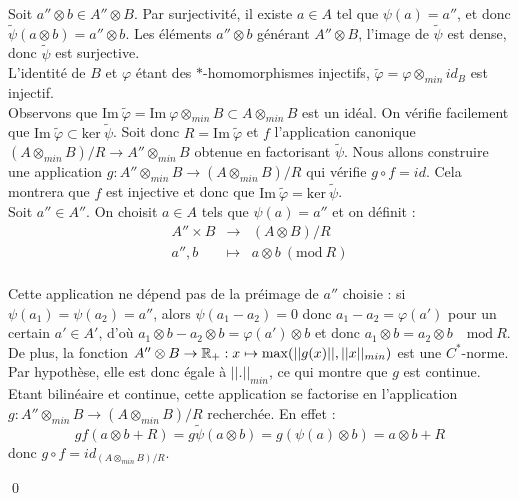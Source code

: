 \begin{dem}
Soit $a''\otimes b \in A''\otimes B$. Par surjectivité, il existe $a\in A$ tel que $\psi(a)=a''$, et donc $\tilde\psi(a\otimes b ) = a''\otimes b$. Les éléments $a''\otimes b$ générant $A''\otimes B$, l'image de $\tilde \psi$ est dense, donc $\tilde \psi$ est surjective.\\

L'identité de $B$ et $\varphi$ étant des $*$-homomorphismes injectifs, $\tilde\varphi = \varphi \otimes_{min}id_B$ est injectif.\\

Observons que $\text{Im} \ \tilde\varphi =\text{Im}\ \varphi \otimes_{min} B\subset A\otimes_{min} B$ est un idéal.  On vérifie facilement que $\text{Im} \ \tilde\varphi \subset \text{ker}\ \tilde \psi $. Soit donc $R=\text{Im} \ \tilde\varphi$ et $f$ l'application canonique $(A\otimes_{min} B)/ R \rightarrow A''\otimes_{min} B$ obtenue en factorisant $\tilde \psi$. Nous allons construire une application $g : A''\otimes_{min} B \rightarrow (A\otimes_{min} B)/ R $ qui vérifie $g\circ f = id $. Cela montrera que $f$ est injective et donc que $\text{Im} \ \tilde\varphi = \text{ker}\ \tilde \psi $.\\

Soit $a''\in A''$. On choisit $a\in A$ tels que $\psi(a)=a''$ et on définit : 
\[\begin{array}{rcl}
A''\times B & \rightarrow & (A\otimes B) /R \\
a'', b          & \mapsto     & a\otimes b \ (\text{mod} \ R)\\
\end{array}\] 

Cette application ne dépend pas de la préimage de $a''$ choisie : si $\psi(a_1)=\psi(a_2)=a''$, alors $\psi(a_1-a_2)=0$ donc $a_1-a_2=\varphi(a')$ pour un certain $a'\in A'$, d'où $a_1\otimes b -a_2\otimes b = \varphi(a')\otimes b$ et donc $a_1\otimes b = a_2\otimes b \quad \text{mod}\ R$.\\
De plus, la fonction $A''\otimes B\rightarrow \mathbb R_+ :  x\mapsto \max (||g(x)||, ||x||_{min})$ est une $C^*$-norme. Par hypothèse, elle est donc égale à $||.||_{min}$, ce qui montre que $g$ est continue.
Etant bilinéaire et continue, cette application se factorise en l'application $g : A''\otimes_{min} B \rightarrow (A\otimes_{min} B) /R$ recherchée. En effet :
\[gf(a\otimes b + R )= g\tilde\psi(a\otimes b)= g(\psi(a)\otimes b)=a\otimes b +R\]
donc $g\circ f = id_{(A\otimes_{min} B)/R}$.

\qed
\end{dem}

